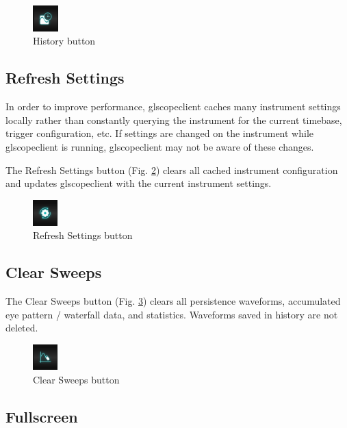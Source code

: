 \begin{figure}[h]
\centering
\includegraphics[height=1cm]{images/history-button.png}
\caption{History button}
\label{historybutton}
\end{figure}

\subsection{Refresh Settings}

In order to improve performance, glscopeclient caches many instrument settings locally rather than constantly querying
the instrument for the current timebase, trigger configuration, etc. If settings are changed on the instrument while
glscopeclient is running, glscopeclient may not be aware of these changes.

The Refresh Settings button (Fig. \ref{refreshbutton}) clears all cached instrument configuration and updates
glscopeclient with the current instrument settings.

\begin{figure}[h]
\centering
\includegraphics[height=1cm]{images/refresh-button.png}
\caption{Refresh Settings button}
\label{refreshbutton}
\end{figure}

\subsection{Clear Sweeps}

The Clear Sweeps button (Fig. \ref{clearbutton}) clears all persistence waveforms, accumulated eye pattern / waterfall
data, and statistics. Waveforms saved in history are not deleted.

\begin{figure}[h]
\centering
\includegraphics[height=1cm]{images/clear-button.png}
\caption{Clear Sweeps button}
\label{clearbutton}
\end{figure}

\subsection{Fullscreen}

